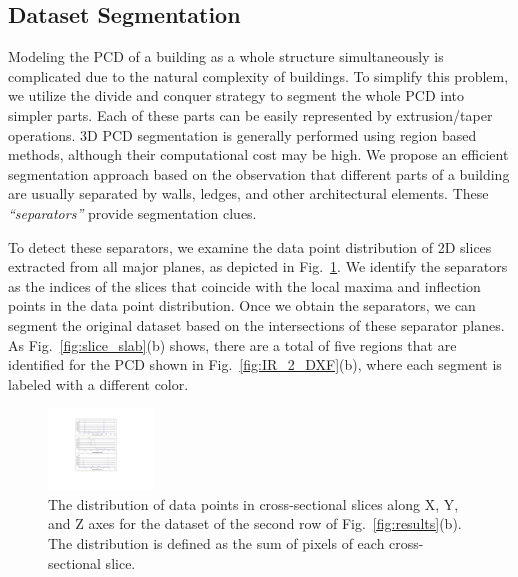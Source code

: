 \documentclass[10pt,twocolumn,letterpaper]{article}
\newcommand{\Fig}[1]{Fig.~\ref{fig:#1}}
\newcommand{\Figb}[1]{Fig.~\ref{fig:#1}(b)}
\begin{document}
\subsection{Dataset Segmentation}
\label{sec:mseg}

Modeling the PCD of a building as a whole structure simultaneously 
is complicated due to the natural complexity of buildings.
To simplify this problem, we utilize the divide and conquer strategy 
to segment the whole PCD into simpler parts.
Each of these parts can be easily represented by extrusion/taper operations. 
3D PCD segmentation is generally performed using region based methods,
although their computational cost may be high.
We propose an efficient segmentation approach based on the observation 
that different parts of a building are usually separated by walls, ledges,
and other architectural elements.
These {\it ``separators''} provide segmentation clues.

To detect these separators, we examine the data point distribution of 2D
slices extracted from all major planes, as depicted in \Fig{plot_seg}.
We identify the separators as the indices of the slices that coincide
with the local maxima and inflection points in the data point distribution.
Once we obtain the separators, we can segment the original dataset based on
the intersections of these separator planes.
As \Figb{slice_slab} shows, there are a total of five regions that are
identified for the PCD shown in \Figb{IR_2_DXF}, where each segment is
labeled with a different color.

\begin{figure}[htbp]
\begin{center}
\includegraphics[width=0.25\textwidth]{plot.pdf}
\end{center}
\caption{
The distribution of data points in cross-sectional slices along X, Y, and Z axes
for the dataset of the second row of \Figb{results}.
The distribution is defined as the sum of pixels of each cross-sectional slice.
}
\label{fig:plot_seg}
\end{figure}
\end{document}
